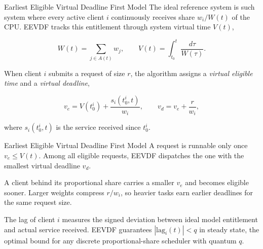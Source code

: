 \documentclass[aspectratio=169]{beamer}
\begin{document}
\begin{frame}{Earliest Eligible Virtual Deadline First Model}
        The ideal reference system is such system where every active
        client $i$ continuously receives share $w_i / W(t)$ of the CPU.
        EEVDF tracks this entitlement through system virtual time $V(t)$,

        $$ W(t)=\sum_{j\in A(t)} w_j, \qquad
        V(t)=\int_{t_0}^{t}\frac{d\tau}{W(\tau)}.$$

        When client $i$ submits a request of size $r$, the algorithm
        assigns a \emph{virtual eligible time} and a \emph{virtual deadline},

        $$v_e = V(t_0^i)+\frac{s_i(t_0^i,t)}{w_i}, \qquad
        v_d = v_e + \frac{r}{w_i},$$

        where $s_i(t_0^i,t)$ is the service received since $t_0^i$.
\end{frame}


\begin{frame}{Earliest Eligible Virtual Deadline First Model}
        A request is runnable only once $v_e \le V(t)$. Among all
        eligible requests, EEVDF dispatches the one with the smallest
        virtual deadline $v_d$.

        \vspace{0.6em}

        A client behind its proportional share carries a smaller $v_e$
        and becomes eligible sooner. Larger weights compress $r/w_i$,
        so heavier tasks earn earlier deadlines for the same request size.

        \vspace{0.6em}

        \begin{shadowbox}
                The lag of client $i$ measures the signed deviation between
                ideal model entitlement and actual service received.
                EEVDF guarantees \cite{stoica} $|\mathrm{lag}_i(t)| <
                q$ in steady state,
                the optimal bound for any discrete proportional-share
                scheduler with quantum $q$.
        \end{shadowbox}
\end{frame}
\end{document}
